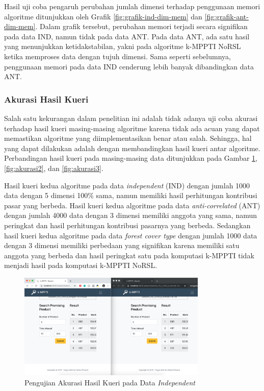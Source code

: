 Hasil uji coba pengaruh perubahan jumlah dimensi terhadap penggunaan memori algoritme ditunjukkan oleh Grafik \ref{fig:grafik-ind-dim-mem} dan \ref{fig:grafik-ant-dim-mem}. Dalam grafik tersebut, perubahan memori terjadi secara signifikan pada data IND, namun tidak pada data ANT. Pada data ANT, ada satu hasil yang menunjukkan ketidakstabilan, yakni pada algoritme k-MPPTI NoRSL ketika memproses data dengan tujuh dimensi. Sama seperti sebelumnya, penggunaan memori pada data IND cenderung lebih banyak dibandingkan data ANT.

\pagebreak
\subsubsection{Akurasi Hasil Kueri} \label{hasil-kueri}
\tab Salah satu kekurangan dalam penelitian ini adalah tidak adanya uji coba akurasi terhadap hasil kueri masing-masing algoritme karena tidak ada acuan yang dapat memastikan algoritme yang diimplementasikan benar atau salah. Sehingga, hal yang dapat dilakukan adalah dengan membandingkan hasil kueri antar algoritme. Perbandingan hasil kueri pada masing-masing data ditunjukkan pada Gambar \ref{fig:akurasi1}, \ref{fig:akurasi2}, dan \ref{fig:akurasi3}.

Hasil kueri kedua algoritme pada data \textit{independent} (IND) dengan jumlah 1000 data dengan 5 dimensi 100\% sama, namun memiliki hasil perhitungan kontribusi pasar yang berbeda. Hasil kueri kedua algoritme pada data \textit{anti-correlated} (ANT) dengan jumlah 4000 data dengan 3 dimensi memiliki anggota yang sama, namun peringkat dan hasil perhitungan kontribusi pasarnya yang berbeda. Sedangkan hasil kueri kedua algoritme pada data \textit{forest cover type} dengan jumlah 1000 data dengan 3 dimensi memiliki perbedaan yang signifikan karena memiliki satu anggota yang berbeda dan hasil peringkat satu pada komputasi k-MPPTI tidak menjadi hasil pada komputasi k-MPPTI NoRSL.

\begin{figure}[H]
	\centering
	\includegraphics[width=9cm]{assets/img/bab5/pengujian-akurasi1.png}
	\caption{Pengujian Akurasi Hasil Kueri pada Data \textit{Independent}}
	\label{fig:akurasi1}
\end{figure}

